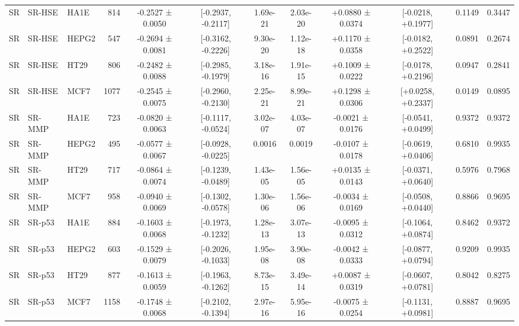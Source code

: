 \begin{landscape}
\begin{longtable}{lll r cc cc cc cc}
\addlinespace[1.5pt]
SR & SR-HSE & HA1E & 814 & -0.2527 ± 0.0050 & [-0.2937, -0.2117] & 1.69e-21 & 2.03e-20 & +0.0880 ± 0.0374 & [-0.0218, +0.1977] & 0.1149 & 0.3447 \\
SR & SR-HSE & HEPG2 & 547 & -0.2694 ± 0.0081 & [-0.3162, -0.2226] & 9.30e-20 & 1.12e-18 & +0.1170 ± 0.0358 & [-0.0182, +0.2522] & 0.0891 & 0.2674 \\
SR & SR-HSE & HT29 & 806 & -0.2482 ± 0.0088 & [-0.2985, -0.1979] & 3.18e-16 & 1.91e-15 & +0.1009 ± 0.0222 & [-0.0178, +0.2196] & 0.0947 & 0.2841 \\
SR & SR-HSE & MCF7 & 1077 & -0.2545 ± 0.0075 & [-0.2960, -0.2130] & 2.25e-21 & 8.99e-21 & +0.1298 ± 0.0306 & [+0.0258, +0.2337] & 0.0149 & 0.0895 \\
\addlinespace[1.5pt]
SR & SR-MMP & HA1E & 723 & -0.0820 ± 0.0063 & [-0.1117, -0.0524] & 3.02e-07 & 4.03e-07 & -0.0021 ± 0.0176 & [-0.0541, +0.0499] & 0.9372 & 0.9372 \\
SR & SR-MMP & HEPG2 & 495 & -0.0577 ± 0.0067 & [-0.0928, -0.0225] & 0.0016 & 0.0019 & -0.0107 ± 0.0178 & [-0.0619, +0.0406] & 0.6810 & 0.9935 \\
SR & SR-MMP & HT29 & 717 & -0.0864 ± 0.0074 & [-0.1239, -0.0489] & 1.43e-05 & 1.56e-05 & +0.0135 ± 0.0143 & [-0.0371, +0.0640] & 0.5976 & 0.7968 \\
SR & SR-MMP & MCF7 & 958 & -0.0940 ± 0.0069 & [-0.1302, -0.0578] & 1.30e-06 & 1.56e-06 & -0.0034 ± 0.0169 & [-0.0508, +0.0440] & 0.8866 & 0.9695 \\
\addlinespace[1.5pt]
SR & SR-p53 & HA1E & 884 & -0.1603 ± 0.0068 & [-0.1973, -0.1232] & 1.28e-13 & 3.07e-13 & -0.0095 ± 0.0312 & [-0.1064, +0.0874] & 0.8462 & 0.9372 \\
SR & SR-p53 & HEPG2 & 603 & -0.1529 ± 0.0079 & [-0.2026, -0.1033] & 1.95e-08 & 3.90e-08 & -0.0042 ± 0.0333 & [-0.0877, +0.0794] & 0.9209 & 0.9935 \\
SR & SR-p53 & HT29 & 877 & -0.1613 ± 0.0059 & [-0.1963, -0.1262] & 8.73e-15 & 3.49e-14 & +0.0087 ± 0.0319 & [-0.0607, +0.0781] & 0.8042 & 0.8275 \\
SR & SR-p53 & MCF7 & 1158 & -0.1748 ± 0.0068 & [-0.2102, -0.1394] & 2.97e-16 & 5.95e-16 & -0.0075 ± 0.0254 & [-0.1131, +0.0981] & 0.8887 & 0.9695 \\
\bottomrule
\end{longtable}
\end{landscape}
